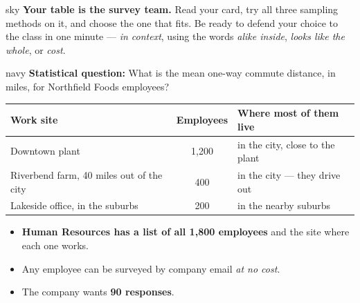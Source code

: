 \documentclass[12pt]{article}
\begin{document}
\clearpage
{}

\boxguard[10]
\begin{headlinebox}{sky}
\small
\textbf{Your table is the survey team.} Read your card, try all three sampling methods on it,
and choose the one that fits. Be ready to defend your choice to the class in one minute ---
\emph{in context}, using the words \emph{alike inside}, \emph{looks like the whole}, or
\emph{cost}.
\end{headlinebox}

\vspace{0.08in}

\boxguard[12]
\begin{scenariobox}{navy}
\small
\textbf{Statistical question:} What is the mean one-way commute distance, in miles, for
Northfield Foods employees?
\par\vspace{4pt}
{\centering\footnotesize
\renewcommand{\arraystretch}{1.2}
\begin{tabular}{@{}l c l@{}}
\rowcolor{sky}
\textbf{Work site} & \textbf{Employees} & \textbf{Where most of them live} \\
\hline
Downtown plant & 1{,}200 & in the city, close to the plant \\
Riverbend farm, 40 miles out of the city & 400 & in the city --- they drive out \\
Lakeside office, in the suburbs & 200 & in the nearby suburbs \\
\end{tabular}\par}
\begin{itemize}[leftmargin=1.3em, itemsep=2pt, topsep=4pt]
  \item \textbf{Human Resources has a list of all 1{,}800 employees} and the site where each
        one works.
  \item Any employee can be surveyed by company email \emph{at no cost}.
  \item The company wants \textbf{90 responses}.
\end{itemize}
\end{scenariobox}
\end{document}
